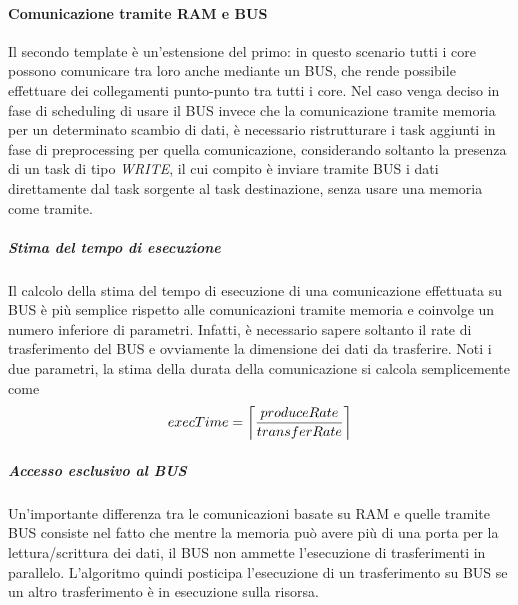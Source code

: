 \paragraph{Comunicazione tramite \acs{RAM} e BUS}
Il secondo template è un'estensione del primo: in questo scenario tutti i 
core possono comunicare tra loro anche mediante un BUS, che rende possibile 
effettuare dei collegamenti punto-punto tra tutti i core. Nel caso venga deciso 
in fase di scheduling di usare il BUS invece che la comunicazione tramite 
memoria per un determinato scambio di dati, è necessario ristrutturare i task 
aggiunti in fase di preprocessing per quella comunicazione, considerando 
soltanto la presenza di un task di tipo \emph{WRITE}, il cui compito è inviare 
tramite BUS i dati direttamente dal task sorgente al task destinazione,
senza usare una memoria come tramite.

\subparagraph{Stima del tempo di esecuzione}
Il calcolo della stima del tempo di esecuzione di una comunicazione effettuata 
su BUS è più semplice rispetto alle comunicazioni tramite memoria e coinvolge 
un numero inferiore di parametri. Infatti, è necessario sapere soltanto il rate 
di trasferimento del BUS e ovviamente la dimensione dei dati da trasferire. 
Noti i due parametri, la stima della durata della comunicazione si calcola 
semplicemente come
\begin{equation}
 execTime = \ceil[\bigg]{\frac{produceRate}{transferRate}}
\end{equation}

\subparagraph{Accesso esclusivo al BUS}
Un'importante differenza tra le comunicazioni basate su \acs{RAM} e quelle 
tramite BUS consiste nel fatto che mentre la memoria può avere più di una porta 
per la lettura/scrittura dei dati, il BUS non ammette l'esecuzione 
di trasferimenti in parallelo. L'algoritmo quindi posticipa l'esecuzione di un 
trasferimento su BUS se un altro trasferimento è in esecuzione sulla risorsa.


